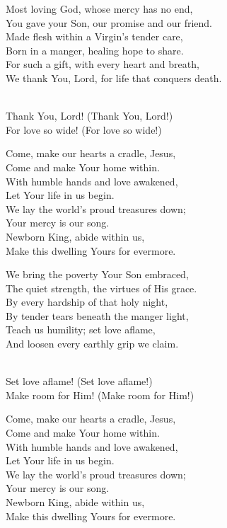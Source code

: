 \begin{lyrics}
Most loving God, whose mercy has no end,\\
You gave your Son, our promise and our friend.\\
Made flesh within a Virgin’s tender care,\\
Born in a manger, healing hope to share.\\
For such a gift, with every heart and breath,\\
We thank You, Lord, for life that conquers death.

\\
Thank You, Lord! (Thank You, Lord!)\\
For love so wide! (For love so wide!)

Come, make our hearts a cradle, Jesus,\\
Come and make Your home within.\\
With humble hands and love awakened,\\
Let Your life in us begin.\\
We lay the world’s proud treasures down;\\
Your mercy is our song.\\
Newborn King, abide within us,\\
Make this dwelling Yours for evermore.

We bring the poverty Your Son embraced,\\
The quiet strength, the virtues of His grace.\\
By every hardship of that holy night,\\
By tender tears beneath the manger light,\\
Teach us humility; set love aflame,\\
And loosen every earthly grip we claim.

\\
Set love aflame! (Set love aflame!)\\
Make room for Him! (Make room for Him!)

Come, make our hearts a cradle, Jesus,\\
Come and make Your home within.\\
With humble hands and love awakened,\\
Let Your life in us begin.\\
We lay the world’s proud treasures down;\\
Your mercy is our song.\\
Newborn King, abide within us,\\
Make this dwelling Yours for evermore.


\end{lyrics}
